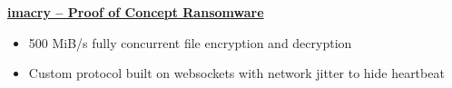 \textbf{\href{https://github.com/prairir/imacry}{imacry -- Proof of Concept Ransomware}} \par

\begin{itemize}
    \item 500 MiB/s fully concurrent file encryption and decryption
    \item Custom protocol built on websockets with network jitter to hide heartbeat
\end{itemize}

